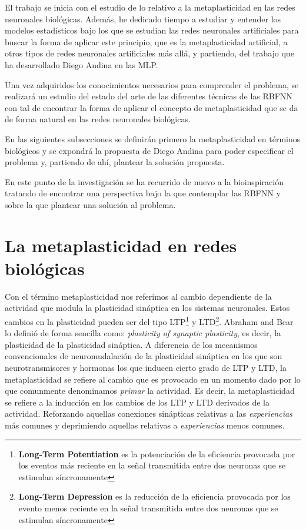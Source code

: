 \documentclass[10pt,a4paper]{report}
\begin{document}
El trabajo se inicia con el estudio de lo relativo a la metaplasticidad en las redes neuronales biológicas. Además, he dedicado tiempo a estudiar y entender los modelos estadísticos bajo los que se estudian las redes neuronales artificiales para buscar la forma de aplicar este principio, que es la metaplasticidad artificial, a otros tipos de redes neuronales artificiales más allá, y partiendo, del trabajo que ha desarrollado Diego Andina en las MLP.

Una vez adquiridos los conocimientos necesarios para comprender el problema, se realizará un estudio del estado del arte de las diferentes técnicas de las RBFNN con tal de encontrar la forma de aplicar el concepto de metaplasticidad que se da de forma natural en las redes neuronales biológicas.

En las siguientes subsecciones se definirán primero la metaplasticidad en términos biológicos y se expondrá la propuesta de Diego Andina para poder especificar el problema y, partiendo de ahí, plantear la solución propuesta. 

En este punto de la investigación se ha recurrido de nuevo a la bioinspiración tratando de encontrar una perspectiva bajo la que contemplar las RBFNN y sobre la que plantear una solución al problema. 

\section{La metaplasticidad en redes biológicas}
Con el término metaplasticidad nos referimos al cambio dependiente de la actividad que modula la plasticidad sináptica en los sistemas neuronales. Estos cambios en la plasticidad pueden ser del tipo LTP\footnote{\textbf{Long-Term Potentiation} es la potenciación de la eficiencia provocada por los eventos más reciente en la señal transmitida entre dos neuronas que se estimulan síncronamente} y LTD\footnote{\textbf{Long-Term Depression} es la reducción de la eficiencia provocada por los evento menos reciente en la señal transmitida entre dos neuronas que se estimulan síncronamente}. Abraham and Bear lo definió de forma sencilla como: \textit{plasticity of synaptic plasticity}, es decir, la plasticidad de la plasticidad sináptica. A diferencia de los mecanismos convencionales de neuromudalación de la plasticidad sináptica en los que son neurotransmisores y hormonas los que inducen cierto grado de LTP y LTD, la metaplasticidad se refiere al cambio que es provocado en un momento dado por lo que comunmente denominamos \textit{primar} la actividad. Es decir, la metaplasticidad se refiere a la inducción en los cambios de los LTP y LTD derivados de la actividad. Reforzando aquellas conexiones sinápticas relativas a las \textit{experiencias} más comunes y deprimiendo aquellas relativas a \textit{experiencias} menos comunes.
\end{document}
